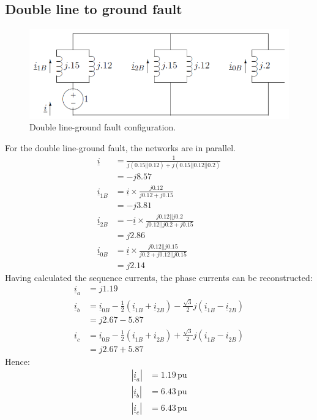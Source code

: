 \documentclass[class=report, crop=false, 12pt,a4paper]{standalone}
\begin{document}
\subsection{Double line to ground fault}
\begin{figure}[H]
	\centering
	\includegraphics[width = \textwidth]{../img/figure43.png}
	\caption{Double line-ground fault configuration.}
\end{figure}
For the double line-ground fault, the networks are in parallel.
\begin{align}
	\underline{i} &= \frac{1}{j\left(0.15||0.12\right)+ j \left(0.15||0.12||0.2\right)}\\
	&= -j8.57\\
	\underline{i}_{1B} &= \underline{i} \times \frac{j0.12}{j0.12 + j0.15}\\
	&= -j3.81\\
	\underline{i}_{2B} &= -\underline{i} \times \frac{j0.12 ||j0.2}{j0.12||j0.2 + j0.15}\\
	&= j2.86\\
	\underline{i}_{0B} &= \underline{i}\times \frac{j0.12||j0.15}{j0.2 + j0.12||j0.15}\\
	&= j2.14
\end{align}
Having calculated the sequence currents, the phase currents can be reconstructed:
\begin{align}
	\underline{i}_a &= j1.19\\
	\underline{i}_b &= \underline{i}_{0B} - \frac{1}{2}\left(\underline{i}_{1B} + \underline{i}_{2B}\right)-\frac{\sqrt{3}}{2}j\left(\underline{i}_{1B} - \underline{i}_{2B}\right)\\
	&= j2.67 - 5.87\\
	\underline{i}_c &= \underline{i}_{0B} - \frac{1}{2}\left(\underline{i}_{1B}+\underline{i}_{2B}\right) + \frac{\sqrt{3}}{2} j \left(\underline{i}_{1B} - \underline{i}_{2B}\right)\\
	&= j2.67 + 5.87
\end{align}
Hence:
\begin{align}
	\left| \underline{i}_{a}\right| &= 1.19\, \textrm{pu}\\
	\left| \underline{i}_{b}\right| &= 6.43\, \textrm{pu}\\
	\left| \underline{i}_{c}\right| &= 6.43\, \textrm{pu}
\end{align}
\end{document}

